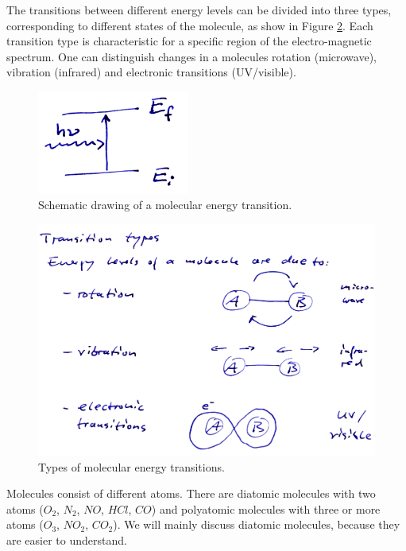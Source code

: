The transitions between different energy levels can be divided into
three types, corresponding to different states of the molecule, as
show in Figure \ref{fig:transition_types}.  Each transition type is
characteristic for a specific region of the electro-magnetic spectrum.
One can distinguish changes in a molecules rotation (microwave),
vibration (infrared) and electronic transitions (UV/visible).

\begin{figure}
  \centering
  \includegraphics[width=5cm]{figures/schematic_energy_states}
  \caption{Schematic drawing of a molecular energy transition.}
  \label{fig:schematic_energies}
\end{figure}

\begin{figure}
  \centering
  \includegraphics[width=\hsize]{figures/transition_types}
  \caption{Types of molecular energy transitions.}
  \label{fig:transition_types}
\end{figure}

Molecules consist of different atoms. There are diatomic molecules with two
atoms ($O_2$, $N_2$, $NO$, $HCl$, $CO$) and polyatomic molecules with
three or more atoms ($O_3$, $NO_2$, $CO_2$). We will mainly discuss
diatomic molecules, because they are easier to understand.

